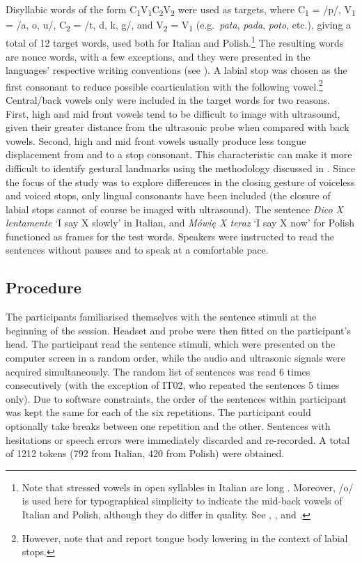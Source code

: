 \documentclass[12pt,]{article}
\let\rmarkdownfootnote\footnote%
\def\footnote{\protect\rmarkdownfootnote}
\begin{document}
Disyllabic words of the form
C\textsubscript{1}V\textsubscript{1}C\textsubscript{2}V\textsubscript{2}
were used as targets, where C\textsubscript{1} = /p/, V\textsubscript{1}
= /a, o, u/, C\textsubscript{2} = /t, d, k, g/, and V\textsubscript{2} =
V\textsubscript{1} (e.g.~\emph{pata}, \emph{pada}, \emph{poto}, etc.),
giving a total of 12 target words, used both for Italian and
Polish.\footnote{Note that stressed vowels in open syllables in Italian are long \citep{renwick2016}. Moreover, /o/ is used here for typographical simplicity to indicate the mid-back vowels of Italian and Polish, although they do differ in quality. See \citet{kramer2009}, \citet{renwick2016}, and \citet{gussmann2007}.}
The resulting words are nonce words, with a few exceptions, and they
were presented in the languages' respective writing conventions (see
). A labial stop was chosen as the first consonant to
reduce possible coarticulation with the following
vowel.\footnote{However, note that \citet{westbury1983} and \citet{vazquez-alvarez2007} report tongue body lowering in the context of labial stops.}
Central/back vowels only were included in the target words for two
reasons. First, high and mid front vowels tend to be difficult to image
with ultrasound, given their greater distance from the ultrasonic probe
when compared with back vowels. Second, high and mid front vowels
usually produce less tongue displacement from and to a stop consonant.
This characteristic can make it more difficult to identify gestural
landmarks using the methodology discussed in . Since the
focus of the study was to explore differences in the closing gesture of
voiceless and voiced stops, only lingual consonants have been included
(the closure of labial stops cannot of course be imaged with
ultrasound). The sentence \emph{Dico X lentamente} `I say X slowly' in
Italian, and \emph{Mówię X teraz} `I say X now' for Polish functioned as
frames for the test words. Speakers were instructed to read the
sentences without pauses and to speak at a comfortable pace.

\hypertarget{procedure}{%
\subsection{Procedure}\label{procedure}}

The participants familiarised themselves with the sentence stimuli at
the beginning of the session. Headset and probe were then fitted on the
participant's head. The participant read the sentence stimuli, which
were presented on the computer screen in a random order, while the audio
and ultrasonic signals were acquired simultaneously. The random list of
sentences was read 6 times consecutively (with the exception of IT02,
who repeated the sentences 5 times only). Due to software constraints,
the order of the sentences within participant was kept the same for each
of the six repetitions. The participant could optionally take breaks
between one repetition and the other. Sentences with hesitations or
speech errors were immediately discarded and re-recorded. A total of
1212 tokens (792 from Italian, 420 from Polish) were obtained.
\end{document}
